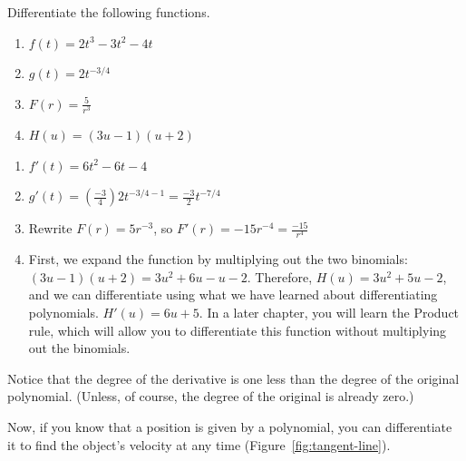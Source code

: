 \begin{Exercise}[title={Differentiation of polynomials}, label=diffpoly]
  Differentiate the following functions.
  \begin{enumerate}
  \item $f(t)=2t^3-3t^2-4t$
  \item $g(t)=2t^{-3/4}$
  \item $F(r) = \frac{5}{r^3}$
  \item $H(u) = (3u-1)(u+2)$
  \end{enumerate}
  \end{Exercise}
\begin{Answer}[ref=diffpoly]
\begin{enumerate}
\item $f'(t) = 6t^2-6t-4$
\item $g'(t) = (\frac{-3}{4})2t^{-3/4-1}=\frac{-3}{2}t^{-7/4}$
\item Rewrite $F(r) = 5r^{-3}$, so $F'(r) = -15r^{-4} = \frac{-15}{r^4}$
\item First, we expand the function by multiplying out the two binomials: $(3u-1)(u+2)=3u^2+6u-u-2$. Therefore, $H(u) = 3u^2+5u-2$, and we can differentiate using what we have learned about differentiating polynomials. $H'(u) = 6u+5$. In a later chapter, you will learn the Product rule, which will allow you to differentiate this function without multiplying out the binomials. 
\end{enumerate}
\end{Answer}
Notice that the degree of the derivative is one less than the degree
of the original polynomial. (Unless, of course, the degree of the
original is already zero.)

Now, if you know that a position is given by a polynomial, you can
differentiate it to find the object's velocity at any time
(Figure~\ref{fig:tangent-line}).

